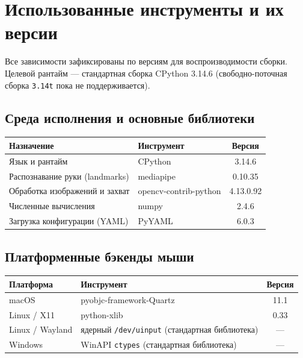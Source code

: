 \documentclass[11pt,a4paper]{article}
\begin{document}
\section{Использованные инструменты и их версии}

Все зависимости зафиксированы по версиям для воспроизводимости сборки. Целевой
рантайм — стандартная сборка CPython 3.14.6 (свободно-поточная сборка \texttt{3.14t}
пока не поддерживается).

\subsection{Среда исполнения и основные библиотеки}

\begin{center}
\begin{tabular}{l >{\ttfamily}l c}
\toprule
\textbf{Назначение} & \normalfont\textbf{Инструмент} & \textbf{Версия} \\
\midrule
Язык и рантайм               & CPython                     & 3.14.6 \\
Распознавание руки (landmarks) & mediapipe                 & 0.10.35 \\
Обработка изображений и захват & opencv-contrib-python      & 4.13.0.92 \\
Численные вычисления          & numpy                       & 2.4.6 \\
Загрузка конфигурации (YAML)  & PyYAML                      & 6.0.3 \\
\bottomrule
\end{tabular}
\end{center}

\subsection{Платформенные бэкенды мыши}

\begin{center}
\begin{tabular}{l >{\ttfamily}l c}
\toprule
\textbf{Платформа} & \normalfont\textbf{Инструмент} & \textbf{Версия} \\
\midrule
macOS          & pyobjc-framework-Quartz & 11.1 \\
Linux / X11    & python-xlib             & 0.33 \\
Linux / Wayland & \normalfont ядерный \texttt{/dev/uinput} (стандартная библиотека) & --- \\
Windows        & \normalfont WinAPI \texttt{ctypes} (стандартная библиотека) & --- \\
\bottomrule
\end{tabular}
\end{center}
\end{document}
